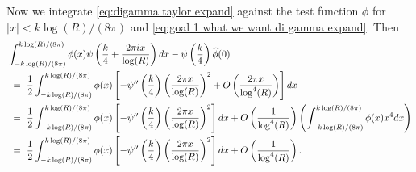 \documentclass[11pt, reqno]{amsart}
\makeatletter
\renewenvironment{proof}[1][\proofname]{\par
  \vspace{-.7\topsep}%
  \pushQED{\qed}%
  \normalfont
  \topsep0pt \partopsep0pt %
  \trivlist
  \item[\hskip\labelsep
        \itshape
    #1\@addpunct{.}]\ignorespaces
}{%
  \popQED\endtrivlist\@endpefalse
  \addvspace{6pt plus 6pt} %
}
\theoremstyle{definition}
\theoremstyle{remark}
\numberwithin{equation}{section}
\renewcommand{\hat}{\widehat}
\makeatother
\begin{document}
\begin{proof}
Now we integrate \eqref{eq:digamma taylor expand} against the test function $\phi$ for $|x| < k\log(R)/(8\pi)$ and \eqref{eq:goal 1 what we want di gamma expand}. Then
\begin{align}\label{eq: digamma substution}
&\int_{-k\log(R)/(8\pi)}^{k\log(R)/(8\pi)}\phi(x)\psi\left(\frac{k}{4}+ \frac{2\pi i x}{\log(R)}\right) dx - \psi\left(\frac{k}{4}\right)\hat\phi(0) \notag \\ & \ = \ \frac{1}{2}\int_{-k\log(R)/(8\pi)}^{k\log(R)/(8\pi)} \phi(x)\left[-\psi''\left(\frac{k}{4}\right)\left(\frac{2\pi x}{\log(R)}\right)^2 + O\left(\frac{2\pi x}{\log^4(R)}\right)\right]dx \notag \\
& \ = \ \frac{1}{2}\int_{-k\log(R)/(8\pi)}^{k\log(R)/(8\pi)} \phi(x)\left[-\psi''\left(\frac{k}{4}\right)\left(\frac{2\pi x}{\log(R)}\right)^2\right]dx + O\left(\frac{1}{\log^4(R)}\right)\left(\int_{-k\log(R)/(8\pi)}^{k\log(R)/(8\pi)} \phi(x)x^4dx\right) \notag \\ 
& \ = \ \frac{1}{2}\int_{-k\log(R)/(8\pi)}^{k\log(R)/(8\pi)} \phi(x)\left[-\psi''\left(\frac{k}{4}\right)\left(\frac{2\pi x}{\log(R)}\right)^2\right]dx + O\left(\frac{1}{\log^4(R)}\right).
\end{align}


\end{proof}
\end{document}
